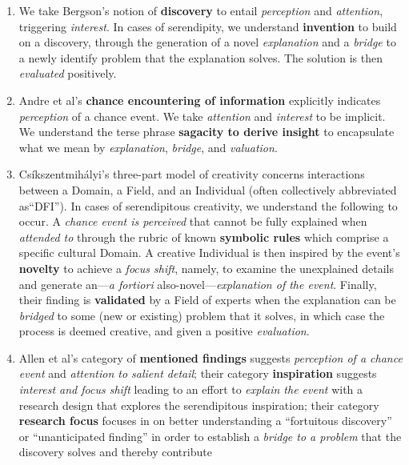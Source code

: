 \begin{enumerate}[label=(\arabic*)]
\item We take Bergson's \cite{bergson1946creative} notion of
  \textbf{discovery} to entail \emph{perception} and \emph{attention},
  triggering \emph{interest}.  In cases of serendipity, we understand
  \textbf{invention} to build on a discovery, through the generation
  of a novel \emph{explanation} and a \emph{bridge} to a newly
  identify problem that the explanation solves.  The solution is then
  \emph{evaluated} positively.
\item Andre et al's \cite{andre2009discovery} \textbf{chance
  encountering of information} explicitly indicates \emph{perception}
  of a chance event.  We take \emph{attention} and
  \emph{interest} to be implicit.  We understand the terse phrase
  \textbf{sagacity to derive insight} to encapsulate what we mean by
  \emph{explanation}, \emph{bridge}, and \emph{valuation}.
\item Cs\'ikszentmih\'alyi's
  \cite{csikszentmihalyi1997flow} three-part model of creativity concerns
  interactions between a Domain, a Field, and an Individual (often
  collectively abbreviated as``DFI'').  In cases of serendipitous
  creativity, we understand the following to occur.
  A \emph{chance event is perceived} that cannot be fully explained
  when \emph{attended to} through the rubric of known \textbf{symbolic
    rules} which comprise a specific cultural Domain.
  A creative Individual is then inspired by the event's
  \textbf{novelty} to achieve a \emph{focus shift}, namely, to examine
  the unexplained details and generate an---\emph{a fortiori} also-novel---\emph{explanation
    of the event}.  Finally, their finding is \textbf{validated} 
  by a Field of experts when the
  explanation can be \emph{bridged} to some (new or existing) problem
  that it solves, in which case the process is deemed creative, and
  given a positive \emph{evaluation}.
\item Allen et al's \cite{Allen:2013:LOD:2655780.2655790}
  category of \textbf{mentioned findings} suggests \emph{perception of a
    chance event} and \emph{attention to salient detail}; their
  category \textbf{inspiration} suggests \emph{interest and focus
    shift} leading to an effort to \emph{explain the event} with a
  research design that explores the serendipitous inspiration; their
  category \textbf{research focus} focuses in on better understanding a
  ``fortuitous discovery'' or ``unanticipated finding'' in order to establish a
  \emph{bridge to a problem} that the discovery solves and thereby contribute

\end{enumerate}
